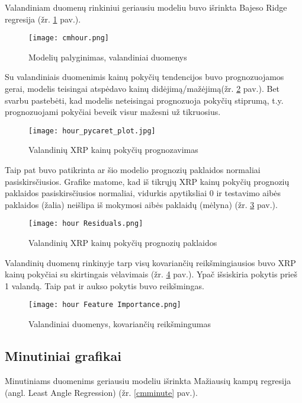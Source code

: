 \documentclass[12pt,a4paper]{article}
\begin{document}
Valandiniam duomenų rinkiniui geriausiu modeliu buvo išrinkta Bajeso Ridge regresija (žr. \ref{cmhour} pav.).

\begin{figure}[!h]
\centering
\caption{Modelių palyginimas, valandiniai duomenys}
\label{cmhour}
\texttt{[image: cmhour.png]}
\end{figure}

Su valandiniais duomenimis kainų pokyčių tendencijos buvo prognozuojamos gerai, modelis teisingai atspėdavo kainų didėjimą/mažėjimą(žr. \ref{hourpredpycaret} pav.). Bet svarbu pastebėti, kad modelis neteisingai prognozuoja pokyčių stiprumą, t.y. prognozuojami pokyčiai beveik visur mažesni už tikruosius.

\begin{figure}[!h]
\centering
\caption{Valandinių XRP kainų pokyčių prognozavimas}
\label{hourpredpycaret}
\texttt{[image: hour\_pycaret\_plot.jpg]}
\end{figure}

Taip pat buvo patikrinta ar šio modelio prognozių paklaidos normaliai pasiskirsčiusios. Grafike matome, kad iš tikrųjų XRP kainų pokyčių prognozių paklaidos pasiskirsčiusios normaliai, vidurkis apytiksliai 0 ir testavimo aibės paklaidos (žalia) neišlipa iš mokymosi aibės paklaidų (mėlyna) (žr. \ref{hourresidpycaret} pav.).

\begin{figure}[!h]
\centering
\caption{Valandinių XRP kainų pokyčių prognozių paklaidos}
\label{hourresidpycaret}
\texttt{[image: hour Residuals.png]}
\end{figure}

Valandinių duomenų rinkinyje tarp visų kovariančių reikšmingiausios buvo XRP kainų pokyčiai su skirtingais vėlavimais (žr. \ref{hourfeatimportance} pav.). Ypač išsiskiria pokytis prieš 1 valandą. Taip pat ir aukso pokytis buvo reikšmingas.

\begin{figure}[!h]
\centering
\caption{Valandiniai duomenys, kovariančių reikšmingumas}
\label{hourfeatimportance}
\texttt{[image: hour Feature Importance.png]}
\end{figure}
\newpage
\clearpage


\subsection{Minutiniai grafikai}
Minutiniams duomenims geriausiu modeliu išrinkta Mažiausių kampų regresija (angl. Least Angle Regression) (žr. \ref{cmminute} pav.). 
\end{document}
